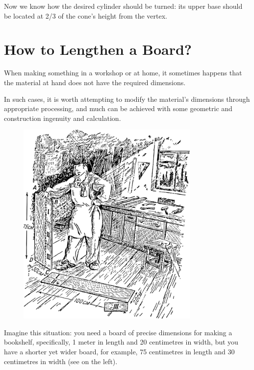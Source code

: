 Now we know how the desired cylinder should be turned: its upper base should be located at 2/3 of the cone's height from the vertex.


\section{How to Lengthen a Board?}
\label{sec-12.15}

When making something in a workshop or at home, it sometimes happens that the material at hand does not have the required dimensions.

In such cases, it is worth attempting to modify the material's dimensions through appropriate processing, and much can be achieved with some geometric and construction ingenuity and calculation.


\begin{figure}[h!]
\centering
\includegraphics[width=0.8\textwidth]{figures/ch-12/fig-189.pdf}
\end{figure}
 

Imagine this situation: you need a board of precise dimensions for making a bookshelf, specifically, 1 meter in length and 20 centimetres in width, but you have a shorter yet wider board, for example, 75 centimetres in length and 30 centimetres in width (see  on the left).

